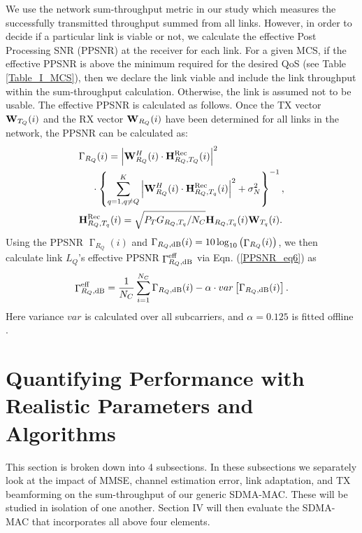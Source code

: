 \documentclass[journal, final]{IEEEtran}
\begin{document}
We use the network sum-throughput metric \cite{COOP_MAC, 13_Sum_rate_3} in our study which measures
the successfully transmitted throughput summed from all links.
However, in order to decide if a particular link is viable or not, we
calculate the effective Post Processing SNR (PPSNR) \cite{8_PER_model_1} at the receiver for
each link. For a given MCS, if the effective PPSNR is above the minimum
required for the desired QoS (see Table \ref{Table_I_MCS}), then we declare the link viable
and include the link throughput within the sum-throughput calculation.
Otherwise, the link is assumed not to be usable. The effective PPSNR is calculated as follows. Once the TX vector ${\rm {\bf W}}_{T_Q } (i)$ and the RX vector ${\rm {\bf
W}}_{R_Q } (i)$ have been determined for all links in the network, the PPSNR
can be calculated as:
\begin{align}
\label{PPSNR_eq5}
&\Gamma_{R_Q } (i) = \left| {\rm {\bf W}}_{R_Q }^H
(i) \cdot {\rm {\bf H}}_{R_Q ,T_Q }^{{\rm Rec}} (i) \right|^2  \notag\\
&\ \ \ \ \cdot\left\{{\sum\limits_{q = 1,q \ne Q}^K {\left| {\rm
{\bf W}}_{R_Q }^H (i) \cdot {\rm {\bf H}}_{R_Q ,T_q }^{{\rm Rec}} (i) \right|^2} + \sigma _N^2 }\right\}^{-1},\\
\label{H_rec}
&{\rm {\bf H}}_{R_Q ,T_q }^{{\rm Rec}} (i) = \sqrt {P_T G_{R_Q ,T_q } / N_C
} {\rm {\bf H}}_{R_Q ,T_q } (i){\rm {\bf W}}_{T_q } (i).
\end{align}
Using the PPSNR $\mathop \Gamma \nolimits_{R_Q } (i)$ and $\Gamma_{R_Q ,{\rm dB}} (i) = 10\log _{10} \left( {\mathop \Gamma
\nolimits_{R_Q } (i)} \right)$, we then calculate
link $L_Q $'s effective PPSNR $\mathop \Gamma \nolimits_{R_Q ,{\rm dB}}^{\rm eff} $
via Eqn. (\ref{PPSNR_eq6}) \cite{8_PER_model_1} as
\begin{eqnarray}
\label{PPSNR_eq6}
\mathop \Gamma \nolimits_{R_Q ,{\rm dB}}^{\rm eff} = \frac{1}{N_C }\sum\limits^{N_C}_{i = 1} {\Gamma_{R_Q ,{\rm dB}} (i)} - \alpha\cdot var \left[ {\Gamma_{R_Q ,{\rm dB}} (i) } \right].
\end{eqnarray}
Here variance $var$ is calculated over all subcarriers, and $\alpha = 0.125$ is fitted offline \cite{8_PER_model_1}.




\section{Quantifying Performance with Realistic Parameters and Algorithms}

This section is broken down into 4 subsections. In these subsections we separately look at the impact of MMSE, channel estimation error, link
adaptation, and TX beamforming on the sum-throughput of our generic SDMA-MAC. These will be studied in isolation of
one another. Section IV will then evaluate the
SDMA-MAC that incorporates all above four elements.
\end{document}
